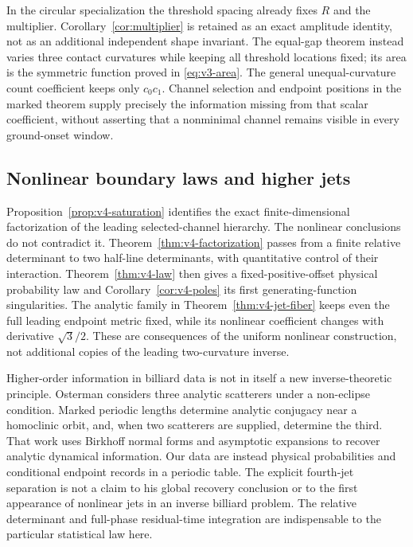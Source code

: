 In the circular specialization the threshold spacing already fixes
$R$ and the multiplier. Corollary~\ref{cor:multiplier} is retained
as an exact amplitude identity, not as an additional independent shape
invariant. The equal-gap theorem instead varies three contact curvatures
while keeping all threshold locations fixed; its area is the symmetric
function proved in \eqref{eq:v3-area}. The general unequal-curvature
count coefficient keeps only $c_0c_1$. Channel selection and endpoint
positions in the marked theorem supply precisely the information
missing from that scalar coefficient, without asserting that a
nonminimal channel remains visible in every ground-onset window.

\subsection{Nonlinear boundary laws and higher jets}
Proposition~\ref{prop:v4-saturation} identifies the exact finite-dimensional
factorization of the leading selected-channel hierarchy. The nonlinear
conclusions do not contradict it. Theorem~\ref{thm:v4-factorization}
passes from a finite relative determinant to two half-line determinants,
with quantitative control of their interaction. Theorem~\ref{thm:v4-law}
then gives a fixed-positive-offset physical probability law and
Corollary~\ref{cor:v4-poles} its first generating-function singularities.
The analytic family in Theorem~\ref{thm:v4-jet-fiber} keeps even the
full leading endpoint metric fixed, while its nonlinear coefficient
changes with derivative $\sqrt3/2$. These are consequences of the
uniform nonlinear construction, not additional copies of the leading
two-curvature inverse.

Higher-order information in billiard data is not in itself a new
inverse-theoretic principle. Osterman \cite{Osterman} considers three
analytic scatterers under a non-eclipse condition. Marked periodic
lengths determine analytic conjugacy near a homoclinic orbit, and,
when two scatterers are supplied, determine the third. That work uses
Birkhoff normal forms and asymptotic expansions to recover analytic
dynamical information. Our data are instead physical probabilities
and conditional endpoint records in a periodic table. The explicit
fourth-jet separation is not a claim to his global recovery conclusion
or to the first appearance of nonlinear jets in an inverse billiard
problem. The relative determinant and full-phase residual-time
integration are indispensable to the particular statistical law here.

